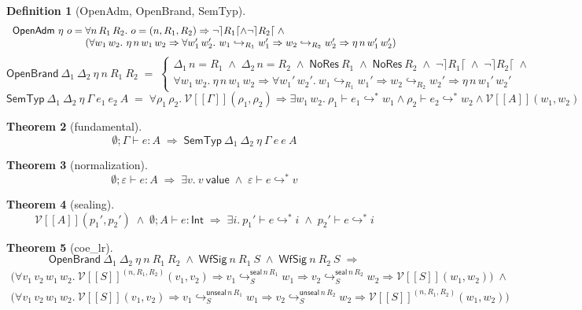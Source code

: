 \documentclass[10pt]{article}
\newtheorem{theorem}{Theorem}[section]
\newtheorem{definition}[theorem]{Definition}
\newcommand{\Int}{\mathsf{Int}}
\newcommand{\tp}{\varepsilon}
\newcommand{\Val}{\mathsf{value}}
\newcommand{\tl}[1]{\rceil #1\lceil}
\newcommand{\msteps}[3]{#1 \vdash #2 \hookrightarrow^{*} #3}
\newcommand{\cast}[3]{#1 \hookrightarrow_{#2} #3}
\newcommand{\sealv}[5]{#4 \hookrightarrow^{\mathsf{seal}\,#1\,#2}_{#3} #5}
\newcommand{\unsealv}[5]{#4 \hookrightarrow^{\mathsf{unseal}\,#1\,#2}_{#3} #5}
\newcommand{\hast}[4]{#1; #2 \vdash #3 : #4}
\newcommand{\sT}[1]{[\![#1]\!]}
\newcommand{\LRg}[2]{\mathcal{V}\sT{#2}^{#1}}
\newcommand{\LRc}[1]{\mathcal{V}\sT{#1}}
\begin{document}
\begin{definition}[\textsf{OpenAdm}, \textsf{OpenBrand}, \textsf{SemTyp}]
\[
\begin{array}{r@{\;}c@{\;}l}
\mathsf{OpenAdm}\ \eta\ o &=& \forall n\,R_1\,R_2.\ o = (n,R_1,R_2) \Rightarrow
  \neg\tl{R_1} \wedge \neg\tl{R_2} \;\wedge \\
&& (\forall w_1\,w_2.\ \eta\,n\,w_1\,w_2 \Rightarrow \forall w_1'\,w_2'.\ \cast{w_1}{R_1}{w_1'} \Rightarrow \cast{w_2}{R_2}{w_2'} \Rightarrow \eta\,n\,w_1'\,w_2')
\end{array}
\]
\[
\mathsf{OpenBrand}\ \Delta_1\ \Delta_2\ \eta\ n\ R_1\ R_2 \;=\;
\left\{
\begin{array}{l}
\Delta_1\,n = R_1 \;\wedge\; \Delta_2\,n = R_2 \;\wedge\; \mathsf{NoRes}\ R_1 \;\wedge\; \mathsf{NoRes}\ R_2 \;\wedge\; \neg\tl{R_1} \;\wedge\; \neg\tl{R_2} \;\wedge \\
\forall w_1\,w_2.\ \eta\,n\,w_1\,w_2 \Rightarrow \forall w_1'\,w_2'.\ \cast{w_1}{R_1}{w_1'} \Rightarrow \cast{w_2}{R_2}{w_2'} \Rightarrow \eta\,n\,w_1'\,w_2'
\end{array}
\right.
\]
\[
\mathsf{SemTyp}\ \Delta_1\ \Delta_2\ \eta\ \Gamma\ e_1\ e_2\ A \;=\;
\forall \rho_1\,\rho_2.\ \LRc{\Gamma}(\rho_1,\rho_2) \Rightarrow
\exists w_1\,w_2.\ \msteps{\rho_1}{e_1}{w_1} \wedge \msteps{\rho_2}{e_2}{w_2} \wedge \LRc{A}(w_1,w_2)
\]
\end{definition}

\begin{theorem}[\textsf{fundamental}]
\[
\hast{\emptyset}{\Gamma}{e}{A} \;\Longrightarrow\; \mathsf{SemTyp}\ \Delta_1\ \Delta_2\ \eta\ \Gamma\ e\ e\ A
\]
\end{theorem}

\begin{theorem}[\textsf{normalization}]
\[
\hast{\emptyset}{\tp}{e}{A} \;\Longrightarrow\; \exists v.\ v\ \Val \;\wedge\; \msteps{\tp}{e}{v}
\]
\end{theorem}

\begin{theorem}[\textsf{sealing}]
\[
\LRc{A}(p_1',p_2') \;\wedge\; \hast{\emptyset}{A}{e}{\Int} \;\Longrightarrow\;
\exists i.\ \msteps{p_1'}{e}{i} \;\wedge\; \msteps{p_2'}{e}{i}
\]
\end{theorem}

\begin{theorem}[\textsf{coe\_lr}]
\[
\mathsf{OpenBrand}\ \Delta_1\ \Delta_2\ \eta\ n\ R_1\ R_2 \;\wedge\;
\mathsf{WfSig}\ n\ R_1\ S \;\wedge\; \mathsf{WfSig}\ n\ R_2\ S \;\Longrightarrow
\]
\[
\begin{array}{l}
\bigl(\forall v_1\,v_2\,w_1\,w_2.\
  \LRg{(n,R_1,R_2)}{S}(v_1,v_2) \Rightarrow \sealv{n}{R_1}{S}{v_1}{w_1} \Rightarrow \sealv{n}{R_2}{S}{v_2}{w_2} \Rightarrow \LRc{S}(w_1,w_2)\bigr) \;\wedge \\
\bigl(\forall v_1\,v_2\,w_1\,w_2.\
  \LRc{S}(v_1,v_2) \Rightarrow \unsealv{n}{R_1}{S}{v_1}{w_1} \Rightarrow \unsealv{n}{R_2}{S}{v_2}{w_2} \Rightarrow \LRg{(n,R_1,R_2)}{S}(w_1,w_2)\bigr)
\end{array}
\]
\end{theorem}
\end{document}
